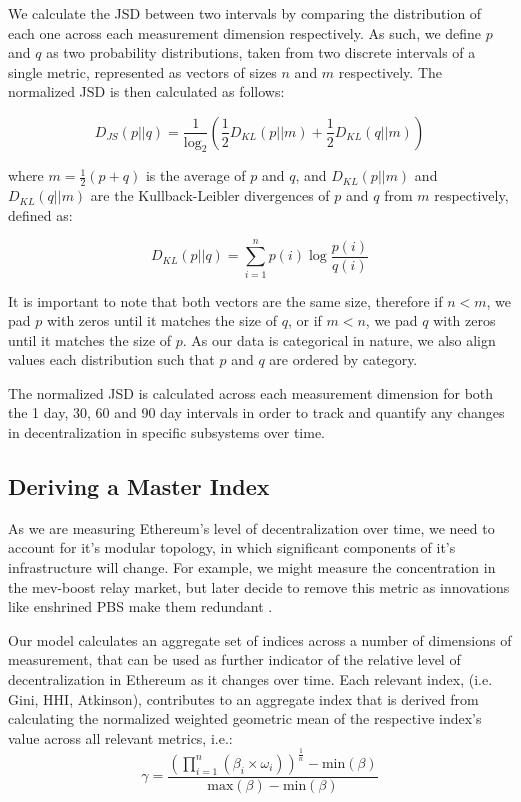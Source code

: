 \documentclass[conference]{IEEEtran}
\begin{document}
We calculate the JSD between two intervals by comparing the distribution of each one across each measurement dimension respectively.  As such, we define $p$ and $q$  as two probability distributions, taken from two discrete intervals of a single metric, represented as vectors of sizes $n$ and $m$ respectively. The normalized JSD is then calculated as follows:


\[ D_{JS}(p||q) = \frac{1}{\log_2} \left( \frac{1}{2} D_{KL}(p||m) + \frac{1}{2} D_{KL}(q||m) \right) \]

\vspace{8pt}

where $m = \frac{1}{2} (p + q)$  is the average of $p$ and $q$, and $D_{KL}(p||m)$ and $D_{KL}(q||m)$ are the Kullback-Leibler divergences of $p$ and $q$  from $m$ respectively, defined as:

\vspace{6pt}

\[
D_{KL}(p||q) = \sum_{i=1}^{n} p(i) \log \frac{p(i)}{q(i)}
\]

\vspace{8pt}

It is important to note that both vectors are the same size, therefore if $n < m$,  we pad $p$ with zeros until it matches the size of $q$, or if $m < n$, we pad $q$ with zeros until it matches the size of $p$.  As our data is categorical in nature, we also align values each distribution such that $p$ and $q$ are ordered by category.  

The normalized JSD is calculated across each measurement dimension for both the 1 day, 30, 60 and 90 day intervals in order to track and quantify any changes in decentralization in specific subsystems over time.

\subsection{Deriving a Master Index}

As we are measuring Ethereum's level of decentralization over time, we need to account for it's modular topology, in which significant components of it's infrastructure will change.  For example, we might measure the concentration in the mev-boost relay market, but later decide to remove this metric as innovations like enshrined PBS make them redundant \cite{neuder2023}.

Our model calculates an aggregate set of indices across a number of dimensions of measurement, that can be used as further indicator of the relative level of decentralization in Ethereum as it changes over time.  Each relevant index, (i.e. Gini, HHI, Atkinson), contributes to an aggregate index that is derived from calculating the normalized weighted geometric mean of the respective index's value across all relevant metrics, i.e.:
\[ \gamma = \frac{{\left(\prod_{i=1}^{n} (\beta_i \times \omega_i)\right)^{\frac{1}{n}} - \text{min}\left(\beta\right)}}{{\text{max}\left(\beta\right) - \text{min}\left(\beta\right)}} \]
\end{document}
